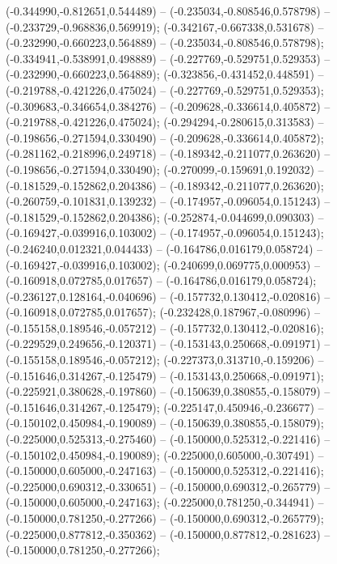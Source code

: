  (-0.344990,-0.812651,0.544489) -- (-0.235034,-0.808546,0.578798) -- (-0.233729,-0.968836,0.569919);
 (-0.342167,-0.667338,0.531678) -- (-0.232990,-0.660223,0.564889) -- (-0.235034,-0.808546,0.578798);
 (-0.334941,-0.538991,0.498889) -- (-0.227769,-0.529751,0.529353) -- (-0.232990,-0.660223,0.564889);
 (-0.323856,-0.431452,0.448591) -- (-0.219788,-0.421226,0.475024) -- (-0.227769,-0.529751,0.529353);
 (-0.309683,-0.346654,0.384276) -- (-0.209628,-0.336614,0.405872) -- (-0.219788,-0.421226,0.475024);
 (-0.294294,-0.280615,0.313583) -- (-0.198656,-0.271594,0.330490) -- (-0.209628,-0.336614,0.405872);
 (-0.281162,-0.218996,0.249718) -- (-0.189342,-0.211077,0.263620) -- (-0.198656,-0.271594,0.330490);
 (-0.270099,-0.159691,0.192032) -- (-0.181529,-0.152862,0.204386) -- (-0.189342,-0.211077,0.263620);
 (-0.260759,-0.101831,0.139232) -- (-0.174957,-0.096054,0.151243) -- (-0.181529,-0.152862,0.204386);
 (-0.252874,-0.044699,0.090303) -- (-0.169427,-0.039916,0.103002) -- (-0.174957,-0.096054,0.151243);
 (-0.246240,0.012321,0.044433) -- (-0.164786,0.016179,0.058724) -- (-0.169427,-0.039916,0.103002);
 (-0.240699,0.069775,0.000953) -- (-0.160918,0.072785,0.017657) -- (-0.164786,0.016179,0.058724);
 (-0.236127,0.128164,-0.040696) -- (-0.157732,0.130412,-0.020816) -- (-0.160918,0.072785,0.017657);
 (-0.232428,0.187967,-0.080996) -- (-0.155158,0.189546,-0.057212) -- (-0.157732,0.130412,-0.020816);
 (-0.229529,0.249656,-0.120371) -- (-0.153143,0.250668,-0.091971) -- (-0.155158,0.189546,-0.057212);
 (-0.227373,0.313710,-0.159206) -- (-0.151646,0.314267,-0.125479) -- (-0.153143,0.250668,-0.091971);
 (-0.225921,0.380628,-0.197860) -- (-0.150639,0.380855,-0.158079) -- (-0.151646,0.314267,-0.125479);
 (-0.225147,0.450946,-0.236677) -- (-0.150102,0.450984,-0.190089) -- (-0.150639,0.380855,-0.158079);
 (-0.225000,0.525313,-0.275460) -- (-0.150000,0.525312,-0.221416) -- (-0.150102,0.450984,-0.190089);
 (-0.225000,0.605000,-0.307491) -- (-0.150000,0.605000,-0.247163) -- (-0.150000,0.525312,-0.221416);
 (-0.225000,0.690312,-0.330651) -- (-0.150000,0.690312,-0.265779) -- (-0.150000,0.605000,-0.247163);
 (-0.225000,0.781250,-0.344941) -- (-0.150000,0.781250,-0.277266) -- (-0.150000,0.690312,-0.265779);
 (-0.225000,0.877812,-0.350362) -- (-0.150000,0.877812,-0.281623) -- (-0.150000,0.781250,-0.277266);
